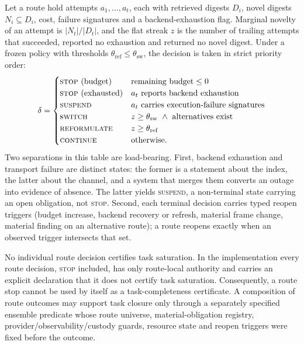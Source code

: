 Let a route hold attempts $a_1,\dots,a_t$, each with retrieved digests
$D_i$, novel digests $N_i \subseteq D_i$, cost, failure signatures and a
backend-exhaustion flag. Marginal novelty of an attempt is $|N_t|/|D_t|$, and
the flat streak $z$ is the number of trailing attempts that succeeded, reported
no exhaustion and returned no novel digest. Under a frozen policy with
thresholds $\theta_{\mathrm{ref}} \leq \theta_{\mathrm{sw}}$, the decision is
taken in strict priority order:
\[
\delta =
\begin{cases}
\textsc{stop}\ (\text{budget}) & \text{remaining budget} \leq 0\\
\textsc{stop}\ (\text{exhausted}) & a_t\ \text{reports backend exhaustion}\\
\textsc{suspend} & a_t\ \text{carries execution-failure signatures}\\
\textsc{switch} & z \geq \theta_{\mathrm{sw}}\ \wedge\ \text{alternatives exist}\\
\textsc{reformulate} & z \geq \theta_{\mathrm{ref}}\\
\textsc{continue} & \text{otherwise.}
\end{cases}
\]
Two separations in this table are load-bearing. First, backend exhaustion and
transport failure are distinct states: the former is a statement about the
index, the latter about the channel, and a system that merges them converts an
outage into evidence of absence. The latter yields \textsc{suspend}, a
non-terminal state carrying an open obligation, not \textsc{stop}. Second, each
terminal decision carries typed reopen triggers (budget increase, backend
recovery or refresh, material frame change, material finding on an alternative
route); a route reopens exactly when an observed trigger intersects that set.

\begin{proposition}
\label{prop:failclosed}
No individual route decision certifies task saturation. In the implementation
every route decision, \textsc{stop} included, has only route-local authority and
carries an explicit declaration that it does not certify task saturation.
Consequently, a route stop cannot be used by itself as a task-completeness
certificate. A composition of route outcomes may support task closure only
through a separately specified ensemble predicate whose route universe,
material-obligation registry, provider/observability/custody guards, resource
state and reopen triggers were fixed before the outcome.
\end{proposition}

